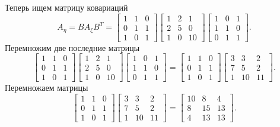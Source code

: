 \begin{enumerate}[label=\alph*)]
  Теперь ищем матрицу ковариаций
  $$A_{ \eta } =
    BA_{ \xi } B^T =
    \begin{bmatrix}
      1 & 1 & 0 \\
      0 & 1 & 1 \\
      1 & 0 & 1
    \end{bmatrix}
    \begin{bmatrix}
      1 & 2 & 1 \\
      2 & 5 & 0 \\
      1 & 0 & 10
    \end{bmatrix}
    \begin{bmatrix}
      1 & 0 & 1 \\
      1 & 1 & 0 \\
      0 & 1 & 1
    \end{bmatrix}.$$
  Перемножим две последние матрицы
  $$ \begin{bmatrix}
      1 & 1 & 0 \\
      0 & 1 & 1 \\
      1 & 0 & 1
    \end{bmatrix}
    \begin{bmatrix}
      1 & 2 & 1 \\
      2 & 5 & 0 \\
      1 & 0 & 10
    \end{bmatrix}
    \begin{bmatrix}
      1 & 0 & 1 \\
      1 & 1 & 0 \\
      0 & 1 & 1
    \end{bmatrix} =
    \begin{bmatrix}
      1 & 1 & 0 \\
      0 & 1 & 1 \\
      1 & 0 & 1
    \end{bmatrix}
    \begin{bmatrix}
      3 & 3 & 2 \\
      7 & 5 & 2 \\
      1 & 10 & 11
    \end{bmatrix}.$$
  Перемножаем матрицы
  $$ \begin{bmatrix}
      1 & 1 & 0 \\
      0 & 1 & 1 \\
      1 & 0 & 1
    \end{bmatrix}
    \begin{bmatrix}
      3 & 3 & 2 \\
      7 & 5 & 2 \\
      1 & 10 & 11
    \end{bmatrix} =
    \begin{bmatrix}
      10 & 8 & 4 \\
      8 & 15 & 13 \\
      4 & 13 & 13
    \end{bmatrix}.$$


\end{enumerate}
